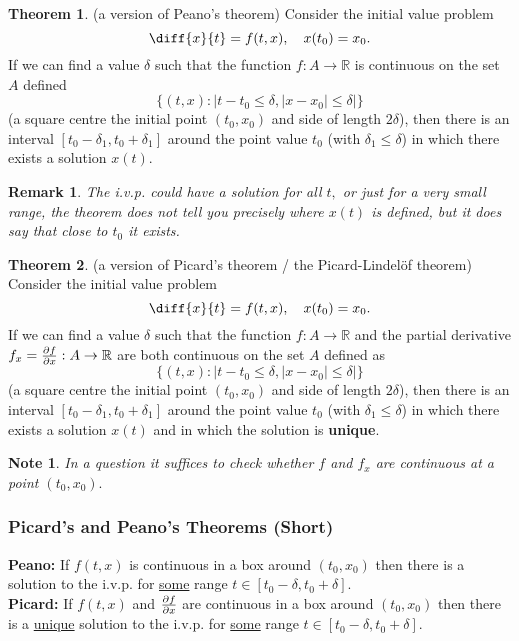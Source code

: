 \documentclass[12pt, a4paper]{article}
\newcommand{\bb}[1]{\mathbb{#1}}
\newtheorem*{remark}{Remark}
\newtheorem*{note}{Note}
\theoremstyle{definition}
\newtheorem{theorem}{Theorem}[section]
\theoremstyle{plain}
\begin{document}
\begin{theorem}
(a version of Peano’s theorem) Consider the initial value problem $$\diff{x}{t}= f(t,x), \quad x(t_0)=x_0.$$ If we can find a value $\delta$ such that the function $f : A \to \bb{R}$ is continuous on the set $A$ defined $$\{(t,x): |t-t_0 \leq \delta, |x-x_0|\leq \delta|\}$$ (a square centre the initial point $(t_0,x_0)$ and side of length $2\delta$), then there is an interval $[t_0-\delta_1, t_0 + \delta_1]$ around the point value $t_0$ (with $\delta_1 \leq \delta$) in which there exists a solution $x(t).$ 
\end{theorem}

\begin{remark}
The i.v.p. could have a solution for all $t,$ or just for a very small range, the theorem does not tell you precisely where $x(t)$ is defined, but it does say that close to $t_0$ it exists.
\end{remark}

\begin{theorem}
(a version of Picard’s theorem / the Picard-Lindelöf theorem) Consider the initial value problem $$\diff{x}{t}=f(t,x), \quad x(t_0)=x_0.$$ If we can find a value $\delta$ such that the function $f : A \to \bb{R}$ and the partial derivative $f_x=\pdv{f}{x} : A \to \bb{R}$ are both continuous on the set $A$ defined as $$\{(t,x): |t-t_0 \leq \delta, |x-x_0|\leq \delta|\}$$ (a square centre the initial point $(t_0,x_0)$ and side of length $2\delta$), then there is an interval $[t_0-\delta_1, t_0 + \delta_1]$ around the point value $t_0$ (with $\delta_1 \leq \delta$) in which there exists a solution $x(t)$ and in which the solution is \textbf{unique}. 
\end{theorem}

\begin{note}
In a question it suffices to check whether $f$ and $f_x$ are continuous at a point $(t_0,x_0).$
\end{note}

\subsubsection{Picard's and Peano's Theorems (Short)}

\textbf{Peano:} If $f(t,x)$ is continuous in a box around $(t_0,x_0)$ then there is a solution to the i.v.p. for \underline{some} range $t \in [t_0-\delta,t_0+\delta].$ \\ \textbf{Picard:} If $f(t,x)$ and $\pdv{f}{x}(t,x)$ are continuous in a box around $(t_0,x_0)$ then there is a \underline{unique} solution to the i.v.p. for \underline{some} range $t \in [t_0-\delta,t_0+\delta].$
\end{document}
